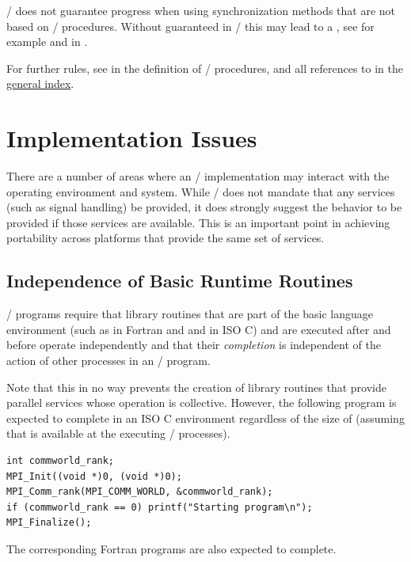 \begin{rationale}
\MPI/ does not guarantee progress when using synchronization methods that are not
based on \MPI/ procedures.
Without guaranteed  in \MPI/ this may lead to a ,
see for example  and
 in .
\end{rationale}


For further rules, see in  the definition of  \MPI/ procedures,
and all references to  in the
\hyperref[index:general]{general index}.   %


\section{Implementation Issues}

There are a number of areas where an \MPI/ implementation may interact
with the operating environment and system.  While \MPI/ does not mandate
that any services (such as signal handling) be provided, it does
strongly suggest the behavior to be provided if those services are
available.  This is an important point in achieving portability across
platforms that provide the same set of services.

\subsection{Independence of Basic Runtime Routines}

\MPI/ programs require that library routines that are part of the
basic language environment (such as
 in Fortran and  and  in
ISO C)
and are executed after  and before 
operate independently and that their \emph{completion} is
independent of the action of other processes in an \MPI/ program.

Note that this in no way prevents the creation of library routines that
provide parallel services whose operation is collective.  However, the
following program is expected to complete in an
ISO C
environment
regardless of the size of  (assuming that
 is available at the executing \MPI/ processes).
\begin{lstlisting}[language={[MPI]C}]
int commworld_rank;
MPI_Init((void *)0, (void *)0);
MPI_Comm_rank(MPI_COMM_WORLD, &commworld_rank);
if (commworld_rank == 0) printf("Starting program\n");
MPI_Finalize();
\end{lstlisting}
The corresponding Fortran programs are also expected to
complete.

